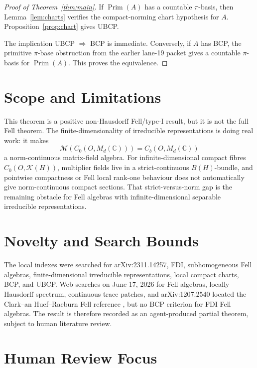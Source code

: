 \documentclass[11pt]{article}
\newcommand{\C}{\mathbb C}
\newcommand{\Kcal}{\mathcal K}
\newcommand{\Prim}{\operatorname{Prim}}
\newcommand{\Mcal}{\mathcal M}
\begin{document}
\begin{proof}[Proof of Theorem~\ref{thm:main}]
If \(\Prim(A)\) has a countable \(\pi\)-basis, then
Lemma~\ref{lem:charts} verifies the compact-norming chart hypothesis for
\(A\).  Proposition~\ref{prop:chart} gives UBCP.

The implication UBCP \(\Rightarrow\) BCP is immediate.  Conversely, if \(A\)
has BCP, the primitive \(\pi\)-base obstruction from the earlier lane-19
packet gives a countable \(\pi\)-basis for \(\Prim(A)\).  This proves the
equivalence.
\end{proof}

\section*{Scope and Limitations}

This theorem is a positive non-Hausdorff Fell/type-I result, but it is not the
full Fell theorem.  The finite-dimensionality of irreducible representations
is doing real work: it makes
\[
        \Mcal(C_0(O,M_d(\C)))=C_b(O,M_d(\C))
\]
a norm-continuous matrix-field algebra.  For infinite-dimensional compact
fibres \(C_0(O,\Kcal(H))\), multiplier fields live in a strict-continuous
\(B(H)\)-bundle, and pointwise compactness or Fell local rank-one behaviour
does not automatically give norm-continuous compact sections.  That
strict-versus-norm gap is the remaining obstacle for Fell algebras with
infinite-dimensional separable irreducible representations.

\section*{Novelty and Search Bounds}

The local indexes were searched for arXiv:2311.14257, FDI, subhomogeneous
Fell algebras, finite-dimensional irreducible representations, local compact
charts, BCP, and UBCP.  Web searches on June 17, 2026 for Fell algebras,
locally Hausdorff spectrum, continuous trace patches, and arXiv:1207.2540
located the Clark--an Huef--Raeburn Fell reference \cite{CHR}, but no BCP
criterion for FDI Fell algebras.  The result is therefore recorded as an
agent-produced partial theorem, subject to human literature review.

\section*{Human Review Focus}
\end{document}
